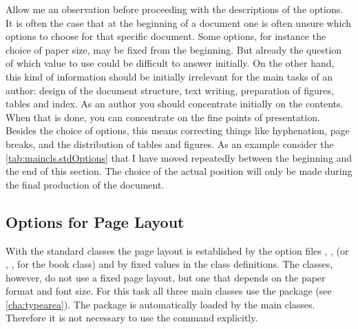 \begin{Explain}
  Allow me an observation before proceeding with the descriptions of
  the options. It is often the case that at the beginning of a
  document one is often unsure which options to choose for that
  specific document. Some options, for instance the choice of paper
  size, may be fixed from the beginning. But already the question of
  which  value to use could be difficult to answer initially.
  On the other hand, this kind of information should be initially
  irrelevant for the main tasks of an author: design of the document
  structure, text writing, preparation of figures, tables and index.
  As an author you should concentrate initially on the contents. When
  that is done, you can concentrate on the fine points of
  presentation. Besides the choice of options, this means correcting
  things like hyphenation, page breaks, and the distribution of tables
  and figures. As an example consider the
  \autoref{tab:maincls.stdOptions} that I have moved repeatedly
  between the beginning and the end of this section. The choice of the
  actual position will only be made during the final production of the
  document.
\end{Explain}
\par

\subsection{Options for Page Layout}
\label{sec:maincls.typeareaOptions}

With the standard classes the page layout is established by
the option files , ,  (or
, ,  for the book class) and by
fixed values in the class definitions. The \KOMAScript{} classes, however, do
not use a fixed page layout, but one that depends on the paper
format and font size. For this task all three main classes
use the  package (see
\autoref{cha:typearea}).  The package is automatically loaded by the
\KOMAScript{} main classes.  Therefore it is not necessary to use the command
explicitly.


